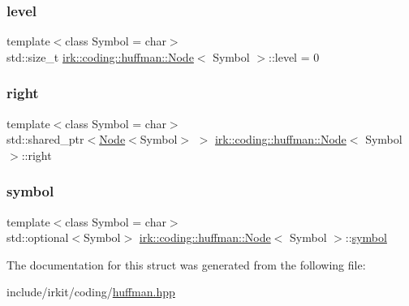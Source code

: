 \mbox{\label{structirk_1_1coding_1_1huffman_1_1Node_aef69da83437b2a01d4db48eb1c0f32d0}} 
\subsubsection{\texorpdfstring{level}{level}}
{\footnotesize\ttfamily template$<$class Symbol = char$>$ \\
std\+::size\+\_\+t \mbox{\hyperlink{structirk_1_1coding_1_1huffman_1_1Node}{irk\+::coding\+::huffman\+::\+Node}}$<$ Symbol $>$\+::level = 0}

\mbox{\label{structirk_1_1coding_1_1huffman_1_1Node_adc2cb094b63cd58afecdee026a6d2168}} 
\subsubsection{\texorpdfstring{right}{right}}
{\footnotesize\ttfamily template$<$class Symbol = char$>$ \\
std\+::shared\+\_\+ptr$<$\mbox{\hyperlink{structirk_1_1coding_1_1huffman_1_1Node}{Node}}$<$Symbol$>$ $>$ \mbox{\hyperlink{structirk_1_1coding_1_1huffman_1_1Node}{irk\+::coding\+::huffman\+::\+Node}}$<$ Symbol $>$\+::right}

\mbox{\label{structirk_1_1coding_1_1huffman_1_1Node_af61be1ebb58460f02dc576cc0d93a100}} 
\subsubsection{\texorpdfstring{symbol}{symbol}}
{\footnotesize\ttfamily template$<$class Symbol = char$>$ \\
std\+::optional$<$Symbol$>$ \mbox{\hyperlink{structirk_1_1coding_1_1huffman_1_1Node}{irk\+::coding\+::huffman\+::\+Node}}$<$ Symbol $>$\+::\mbox{\hyperlink{porter2_8hpp_a04438e24473719aaf288c57833717164}{symbol}}}



The documentation for this struct was generated from the following file\+:\begin{DoxyCompactItemize}
\item 
include/irkit/coding/\mbox{\hyperlink{huffman_8hpp}{huffman.\+hpp}}\end{DoxyCompactItemize}
